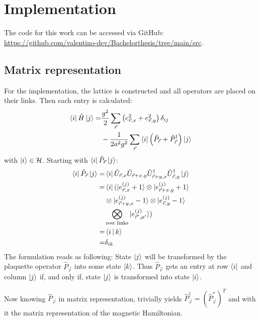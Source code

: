 \section{Implementation}
The code for this work can be accessed via GitHub: \url{https://github.com/valentino-dev/Bachelorthesis/tree/main/src}.
\subsection{Matrix representation}
For the implementation, the lattice is constructed and all operators are placed on their links. Then each entry is calculated:
\begin{align*}
	\bra{i}\hat{H}\ket{j} = & \frac{g^2}{2}\sum_{\vec{r}}\left(e_{\vec{r}, x}^2+e_{\vec{r}, y}^2\right)\delta_{ij}           \\
                          & -\frac{1}{2a^2g^2}\sum_{\vec{r}}\bra{i}\left(\hat{P}_{\vec{r}}+\hat{P}_{\vec{r}}^{\dag}\right)\ket{j}
\end{align*}
with $\ket{i}\in\cal{H}$. Starting with $\bra{i}\hat{P}_{\vec{r}}\ket{j}$:
\begin{align*}
	\bra{i}\hat{P}_{\vec{r}}\ket{j}= & \bra{i}\hat{U}_{\vec{r}, x}\hat{U}_{\vec{r}+x,y}\hat{U}^{\dag}_{\vec{r}+y,x}\hat{U}^{\dag}_{\vec{r},y}\ket{j} \\
	=                                & \bra{i}(\ket{e^{(j)}_{\vec{r}, x}+1}\otimes\ket{e^{(j)}_{\vec{r}+x, y}+1}                                \\
	                                 & \otimes\ket{e^{(j)}_{\vec{r}+y, x}-1}\otimes\ket{e^{(j)}_{\vec{r}, y}-1}                                      \\
	                                 & \bigotimes_\text{rest links}\ket{e^{(j)}_{\vec{r}', \mu'}})                                             \\
	=                                & \Braket{i|k}                                                                                                  \\
	=                                & \delta_{ik}
\end{align*}
The formulation reads as following: State $\ket{j}$ will be transformed by the plaquette operator $\hat{P}_{\vec{r}}$ into some state $\ket{k}$. Thus $\hat{P}_{\vec{r}}$ gets an entry at row $\bra{i}$ and column $\ket{j}$ if, and only if, state $\ket{j}$ is transformed into state $\ket{i}$.

Now knowing $\hat{P}_{\vec{r}}$ in matrix representation, trivially yields $\hat{P}_{\vec{r}}^{\dag}=\left(\hat{P}_{\vec{r}}^{*}\right)^{T}$ and with it the matrix representation of the magnetic Hamiltonian.

